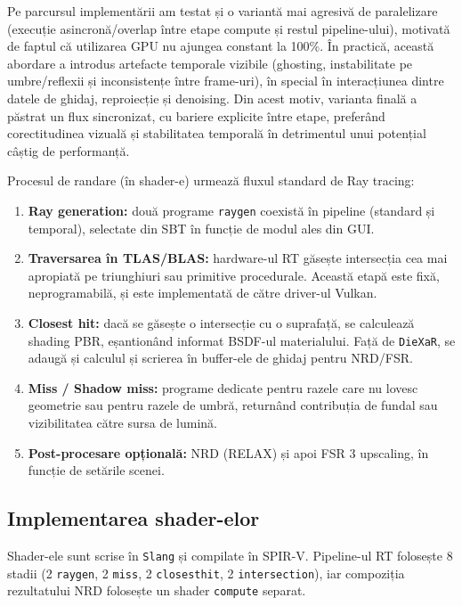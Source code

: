 \documentclass[12pt,a4paper]{report}
\numberwithin{equation}{section} %
\begin{document}
Pe parcursul implementării am testat și o variantă mai agresivă de paralelizare (execuție asincronă/overlap între etape compute și restul pipeline-ului), motivată de faptul că utilizarea GPU nu ajungea constant la 100\%.
În practică, această abordare a introdus artefacte temporale vizibile (ghosting, instabilitate pe umbre/reflexii și inconsistențe între frame-uri), în special în interacțiunea dintre datele de ghidaj, reproiecție și denoising.
Din acest motiv, varianta finală a păstrat un flux sincronizat, cu bariere explicite între etape, preferând corectitudinea vizuală și stabilitatea temporală în detrimentul unui potențial câștig de performanță.

Procesul de randare (în shader-e) urmează fluxul standard de Ray tracing:
\begin{enumerate}
    \item \textbf{Ray generation:} două programe \texttt{raygen} coexistă în pipeline (standard și temporal), selectate din SBT în funcție de modul ales din GUI.
    \item \textbf{Traversarea în TLAS/BLAS:} hardware-ul RT găsește intersecția cea mai apropiată pe triunghiuri sau primitive procedurale.
          Această etapă este fixă, neprogramabilă, și este implementată de către driver-ul Vulkan.
    \item \textbf{Closest hit:} dacă se găsește o intersecție cu o suprafață, se calculează shading PBR, eșantionând informat BSDF-ul materialului.
          Față de \texttt{DieXaR}, se adaugă și calculul și scrierea în buffer-ele de ghidaj pentru NRD/FSR.
    \item \textbf{Miss / Shadow miss:} programe dedicate pentru razele care nu lovesc geometrie sau pentru razele de umbră, returnând contribuția de fundal sau vizibilitatea către sursa de lumină.
    \item \textbf{Post-procesare opțională:} NRD (RELAX) și apoi FSR 3 upscaling, în funcție de setările scenei.
\end{enumerate}

\subsection{Implementarea shader-elor}

Shader-ele sunt scrise în \texttt{Slang} și compilate în SPIR-V.
Pipeline-ul RT folosește 8 stadii (2 \texttt{raygen}, 2 \texttt{miss}, 2 \texttt{closesthit}, 2 \texttt{intersection}), iar compoziția rezultatului NRD folosește un shader \texttt{compute} separat.
\end{document}
